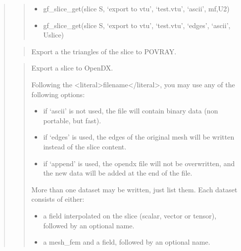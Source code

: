 \documentclass[a4paper,11pt,english]{sphinxmanual}
\begin{document}
\begin{quote}
\begin{quote}
\begin{itemize}
\item {} 
\sphinxAtStartPar
gf\_slice\_get(slice S, ‘export to vtu’, ‘test.vtu’, ‘ascii’, mf,U2)

\item {} 
\sphinxAtStartPar
gf\_slice\_get(slice S, ‘export to vtu’, ‘test.vtu’, ‘edges’, ‘ascii’, Uslice)

\end{itemize}
\end{quote}

\sphinxAtStartPar
{}
\begin{quote}

\sphinxAtStartPar
Export a the triangles of the slice to POV\sphinxhyphen{}RAY.
\end{quote}

\sphinxAtStartPar
{}
\begin{quote}

\sphinxAtStartPar
Export a slice to OpenDX.

\sphinxAtStartPar
Following the \textless{}literal\textgreater{}filename\textless{}/literal\textgreater{}, you may use any of the following
options:
\begin{itemize}
\item {} 
\sphinxAtStartPar
if ‘ascii’ is not used, the file will contain binary data
(non portable, but fast).

\item {} 
\sphinxAtStartPar
if ‘edges’ is used, the edges of the original mesh will be
written instead of the slice content.

\item {} 
\sphinxAtStartPar
if ‘append’ is used, the opendx file will not be overwritten,
and the new data will be added at the end of the file.

\end{itemize}

\sphinxAtStartPar
More than one dataset may be written, just list them. Each dataset
consists of either:
\begin{itemize}
\item {} 
\sphinxAtStartPar
a field interpolated on the slice (scalar, vector or tensor),
followed by an optional name.

\item {} 
\sphinxAtStartPar
a mesh\_fem and a field, followed by an optional name.


\end{itemize}
\end{quote}
\end{quote}
\end{document}
